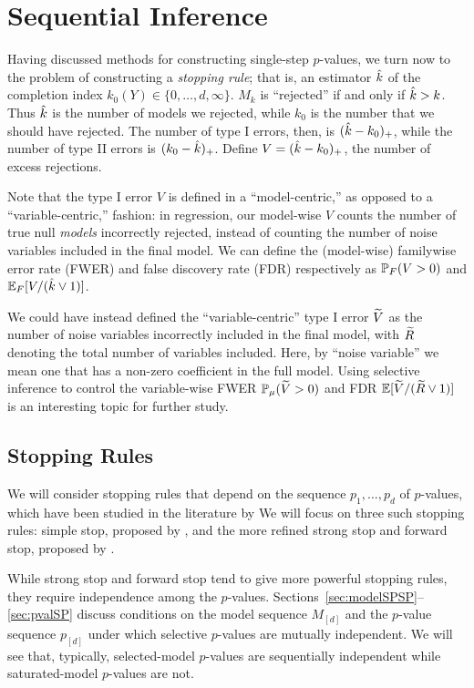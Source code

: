 \documentclass{article}
\begin{document}
\section{Sequential Inference}

Having discussed methods for constructing single-step $p$-values, we turn now to the problem of constructing a {\em stopping rule}; that is, an estimator $\hk$ of the completion index $k_0(Y)\in \{0,\ldots,d,\infty\}$. $M_k$ is ``rejected'' if and only if $\hk>k$. Thus $\hk$ is the number of models we rejected, while $k_0$ is the number that we should have rejected. The number of type I errors, then, is $(\hk-k_0)_+$, while the number of type II errors is $(k_0-\hk)_+$. Define $V=(\hk-k_0)_+$, the number of excess rejections.

Note that the type I error $V$ is defined in a ``model-centric,'' as opposed to a ``variable-centric,'' fashion: in regression, our model-wise $V$ counts the number of true null {\em models} incorrectly rejected, instead of counting the number of noise variables included in the final model. We can define the (model-wise) familywise error rate (FWER) and false discovery rate (FDR) respectively as $\P_F(V >0)$ and $\E_F[V/(\hk \vee 1)]$. 

We could have instead defined the ``variable-centric'' type I error $\tV$ as the number of noise variables incorrectly included in the final model, with $\tR$ denoting the total number of variables included. Here, by ``noise variable'' we mean one that has a non-zero coefficient in the full model. Using selective inference to control the variable-wise FWER $\P_\mu(\tV>0)$ and FDR $\E[\tV / (\tR \vee 1)]$ is an interesting topic for further study.

\subsection{Stopping Rules}

We will consider stopping rules that depend on the sequence $p_1,\ldots,p_d$ of $p$-values, which have been studied in the literature by  We will focus on three such stopping rules: simple stop, proposed by , and the more refined strong stop and forward stop, proposed by \citet{gsell2013sequential}. 

While strong stop and forward stop tend to give more powerful stopping rules, they require independence among the $p$-values. Sections~\ref{sec:modelSPSP}--\ref{sec:pvalSP} discuss conditions on the model sequence $M_{[d]}$ and the $p$-value sequence $p_{[d]}$ under which selective $p$-values are mutually independent. We will see that, typically, selected-model $p$-values are sequentially independent while saturated-model $p$-values are not.
\end{document}
